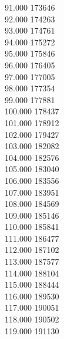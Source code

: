 { 91.000	173646 \\
 92.000	174263 \\
 93.000	174761 \\
 94.000	175272 \\
 95.000	175846 \\
 96.000	176405 \\
 97.000	177005 \\
 98.000	177354 \\
 99.000	177881 \\
 100.000	178437 \\
 101.000	178912 \\
 102.000	179427 \\
 103.000	182082 \\
 104.000	182576 \\
 105.000	183040 \\
 106.000	183556 \\
 107.000	183951 \\
 108.000	184569 \\
 109.000	185146 \\
 110.000	185841 \\
 111.000	186477 \\
 112.000	187102 \\
 113.000	187577 \\
 114.000	188104 \\
 115.000	188444 \\
 116.000	189530 \\
 117.000	190051 \\
 118.000	190502 \\
 119.000	191130 \\
}
